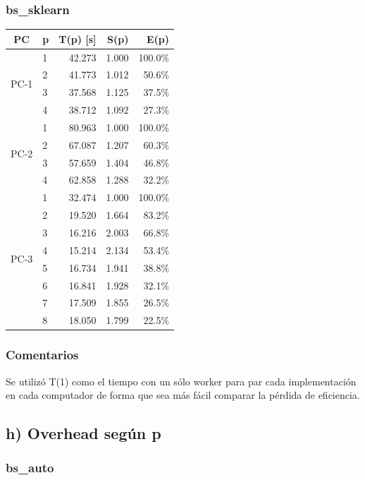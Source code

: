 \documentclass[11pt]{article}
\begin{document}
\subsubsection*{bs\_sklearn}
\begin{center}
\begin{tabular}{clrrr}
\toprule
PC & p & T(p) [s] & S(p) & E(p) \\
\midrule
\multirow{4}{*}{PC-1} & 1 & 42.273 & 1.000 & 100.0\% \\
 & 2 & 41.773 & 1.012 & 50.6\% \\
 & 3 & 37.568 & 1.125 & 37.5\% \\
 & 4 & 38.712 & 1.092 & 27.3\% \\
\midrule
\multirow{4}{*}{PC-2} & 1 & 80.963 & 1.000 & 100.0\% \\
 & 2 & 67.087 & 1.207 & 60.3\% \\
 & 3 & 57.659 & 1.404 & 46.8\% \\
 & 4 & 62.858 & 1.288 & 32.2\% \\
\midrule
\multirow{8}{*}{PC-3} & 1 & 32.474 & 1.000 & 100.0\% \\
 & 2 & 19.520 & 1.664 & 83.2\% \\
 & 3 & 16.216 & 2.003 & 66.8\% \\
 & 4 & 15.214 & 2.134 & 53.4\% \\
 & 5 & 16.734 & 1.941 & 38.8\% \\
 & 6 & 16.841 & 1.928 & 32.1\% \\
 & 7 & 17.509 & 1.855 & 26.5\% \\
 & 8 & 18.050 & 1.799 & 22.5\% \\
\bottomrule
\end{tabular}
\end{center}

\subsubsection*{Comentarios}

Se utiliz\'o T(1) como el tiempo con un s\'olo worker para par cada implementaci\'on en cada computador de forma que sea m\'as f\'acil comparar la p\'erdida de eficiencia.

\subsection*{h) Overhead seg\'un p}

\subsubsection*{bs\_auto}
\end{document}
